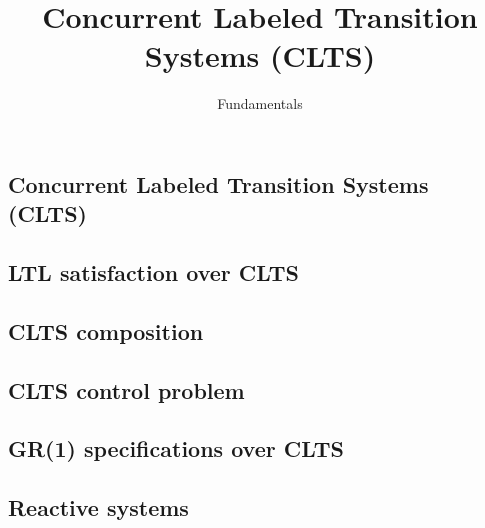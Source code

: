 \documentclass{article}
\title{Concurrent Labeled Transition Systems (CLTS)} %
\author{Fundamentals} %
\date{}
\begin{document}
\maketitle

\setcounter{section}{1} %
\setcounter{theorem}{1} %

\subsection{Concurrent Labeled Transition Systems (CLTS)}


\subsection{LTL satisfaction over CLTS}


%

%

\subsection{CLTS composition}


\subsection{CLTS control problem}


\subsection{GR(1) specifications over CLTS}


\subsection{Reactive systems}

\end{document}
